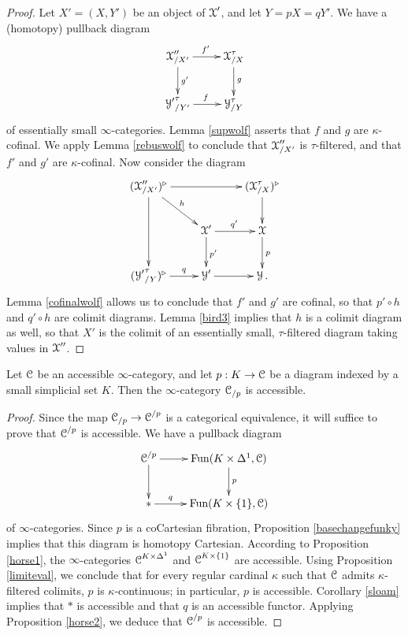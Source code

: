 \begin{proof}
Let $X' = (X,Y')$ be an object of $\operatorname{\mathcal{X}}'$, and let $Y = pX = qY'$. We have a (homotopy) pullback
diagram
$$ \xymatrix{ \calX''_{/X'} \ar[r]^{f'} \ar[d]^{g'} & \calX^{\tau}_{/X} \ar[d]^{g} \\
{\calY'}^{\tau}_{/Y'} \ar[r]^{f} & \calY^{\tau}_{/Y} }$$
of essentially small $\infty$-categories. Lemma \ref{supwolf} asserts that $f$ and $g$ are $\kappa$-cofinal.
We apply Lemma \ref{rebuswolf} to conclude that $\operatorname{\mathcal{X}}''_{/X'}$ is $\tau$-filtered, and that 
$f'$ and $g'$ are $\kappa$-cofinal. Now consider the diagram
$$ \xymatrix{ (\calX''_{/X'})^{\triangleright} \ar[dd] \ar[dr]^{h} \ar[rr] & & (\calX^{\tau}_{/X})^{\triangleright} \ar[d] \\
& \calX' \ar[r]^{q'} \ar[d]^{p'} & \calX \ar[d]^{p} \\
({\calY'}^{\tau}_{/Y})^{\triangleright} \ar[r]^-{q} & \calY' \ar[r] & \calY. }$$
Lemma \ref{cofinalwolf} allows us to conclude that $f'$ and $g'$ are cofinal, so that
$p' \circ h$ and $q' \circ h$ are colimit diagrams. Lemma \ref{bird3} implies that $h$ is a colimit diagram as well,
so that $X'$ is the colimit of an essentially small, $\tau$-filtered diagram taking values in $\operatorname{\mathcal{X}}''$.
\end{proof}

\begin{corollary}\label{horsemuun}
Let $\operatorname{\mathcal{C}}$ be an accessible $\infty$-category, and let $p: K \rightarrow \operatorname{\mathcal{C}}$ be a diagram indexed by a small simplicial set $K$. Then the $\infty$-category $\operatorname{\mathcal{C}}_{/p}$ is accessible. 
\end{corollary}

\begin{proof}
Since the map $\operatorname{\mathcal{C}}_{/p} \rightarrow \operatorname{\mathcal{C}}^{/p}$ is a categorical equivalence, it will suffice to prove that $\operatorname{\mathcal{C}}^{/p}$ is accessible. We have a pullback diagram
$$ \xymatrix{ \calC^{/p} \ar[r] \ar[d] & \Fun(K \times \Delta^1, \calC) \ar[d]^{p} \\
\ast \ar[r]^-{q} & \Fun(K \times \{1\}, \calC) }$$ 
of $\infty$-categories. Since $p$ is a coCartesian fibration, Proposition \ref{basechangefunky} implies that this diagram is homotopy Cartesian. According to Proposition \ref{horse1},
the $\infty$-categories $\operatorname{\mathcal{C}}^{K \times \Delta^1}$ and $\operatorname{\mathcal{C}}^{K \times \{1\} }$ are accessible. Using Proposition \ref{limiteval}, we conclude that for every regular cardinal $\kappa$ such
that $\operatorname{\mathcal{C}}$ admits $\kappa$-filtered colimits, $p$ is $\kappa$-continuous; in particular, $p$ is accessible. Corollary \ref{sloam} implies that $\ast$ is accessible and that $q$ is an accessible functor. Applying Proposition \ref{horse2}, we deduce that $\operatorname{\mathcal{C}}^{/p}$ is accessible.
\end{proof}

